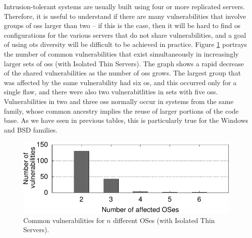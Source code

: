 Intrusion-tolerant systems are usually built using four or more replicated servers. 
Therefore, it is useful to understand if there are many vulnerabilities that involve groups of \glspl{os} larger than two -- if this is the case, then it will be hard to find \gls{os} configurations for the various servers that do not share vulnerabilities, and a goal of using \gls{ots} diversity will be difficult to be achieved in practice. 
Figure \ref{top} portrays the number of common vulnerabilities that exist simultaneously in increasingly larger sets of \glspl{os} (with Isolated Thin Servers). 
The graph shows a rapid decrease of the shared vulnerabilities as the number of \glspl{os} grows. 
The largest group that was affected by the same vulnerability had six \gls{os}, and this occurred only for a single flaw, and there were also two vulnerabitlities in sets with five \glspl{os}. Vulnerabilities in two and three \glspl{os} normally occur in systems from the same family, whose common ancestry implies the reuse of larger portions of the code base.
As we have seen in previous tables, this is particularly true for the Windows and BSD families.

\begin{figure}[!h]
 \centering
 \includegraphics[]{images/gnuplot/spe/top/top.pdf}
 \caption{Common vulnerabilities for $n$ different OSes (with Isolated Thin Servers).}
 \label{top}
\end{figure}


